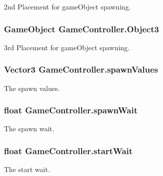 2nd Placement for game\-Object spawning. 

\hypertarget{classGameController_a9956f5a361f097e051a144a2b787e5ca}{
\subsubsection[{Object3}]{\setlength{\rightskip}{0pt plus 5cm}Game\-Object Game\-Controller.\-Object3}}\label{classGameController_a9956f5a361f097e051a144a2b787e5ca}


3rd Placement for game\-Object spawning. 

\hypertarget{classGameController_a5e4f56c23896d4b528da579f93335896}{
\subsubsection[{spawn\-Values}]{\setlength{\rightskip}{0pt plus 5cm}Vector3 Game\-Controller.\-spawn\-Values}}\label{classGameController_a5e4f56c23896d4b528da579f93335896}


The spawn values. 

\hypertarget{classGameController_a27c91a14de3982813ad3d8245d0134d7}{
\subsubsection[{spawn\-Wait}]{\setlength{\rightskip}{0pt plus 5cm}float Game\-Controller.\-spawn\-Wait}}\label{classGameController_a27c91a14de3982813ad3d8245d0134d7}


The spawn wait. 

\hypertarget{classGameController_a9b6f96c29d3ee0f2c692c30ed2b12835}{
\subsubsection[{start\-Wait}]{\setlength{\rightskip}{0pt plus 5cm}float Game\-Controller.\-start\-Wait}}\label{classGameController_a9b6f96c29d3ee0f2c692c30ed2b12835}


The start wait. 

